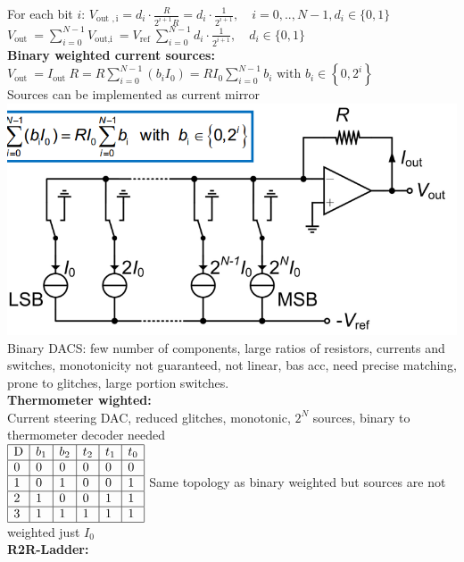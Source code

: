 \documentclass[5pt,landscape]{article}
\begin{document}
\begin{multicols*}{5}
For each bit $ i $: $ V_{\text {out }, \mathrm{i}}=d_{i} \cdot \frac{R}{2^{i+1} R}=d_{i} \cdot \frac{1}{2^{i+1}}, \quad i=0, . ., N-1, d_{i} \in\{0,1\} $\\
$ V_{\text {out }}=\sum_{i=0}^{N-1} V_{\text {out,i }}=V_{\text {ref }} \sum_{i=0}^{N-1} d_{i} \cdot \frac{1}{2^{i+1}}, \quad d_{i} \in\{0,1\} $\\
\textbf{Binary weighted current sources:}\\
$ V_{\text {out }}=I_{\text {out }} R=R \sum_{i=0}^{N-1}\left(b_{i} I_{0}\right)=R I_{0} \sum_{i=0}^{N-1} b_{i} \text { with } b_{i} \in\left\{0,2^{i}\right\} $\\
Sources can be implemented as current mirror\\
\includegraphics[width=\columnwidth]{images/dac_binary_current_sources.png}
Binary DACS: few number of components, large ratios of resistors, currents and switches, monotonicity not guaranteed, not linear, bas acc, need precise matching, prone to glitches, large portion switches.\\
\textbf{Thermometer wighted:}\\
Current steering DAC, reduced glitches, monotonic, $ 2^N $ sources, binary to thermometer decoder needed\\
$ \begin{array}{|l|l|l|l|l|l|}
\hline \mathrm{D} & b_{1} & b_{2} & t_{2} & t_{1} & t_{0} \\
\hline 0 & 0 & 0 & 0 & 0 & 0 \\
\hline 1 & 0 & 1 & 0 & 0 & 1 \\
\hline 2 & 1 & 0 & 0 & 1 & 1 \\
\hline 3 & 1 & 1 & 1 & 1 & 1 \\
\hline
\end{array} $
Same topology as binary weighted but sources are not weighted just $ I_0 $\\
\textbf{R2R-Ladder:}\\

\end{multicols*}
\end{document}

